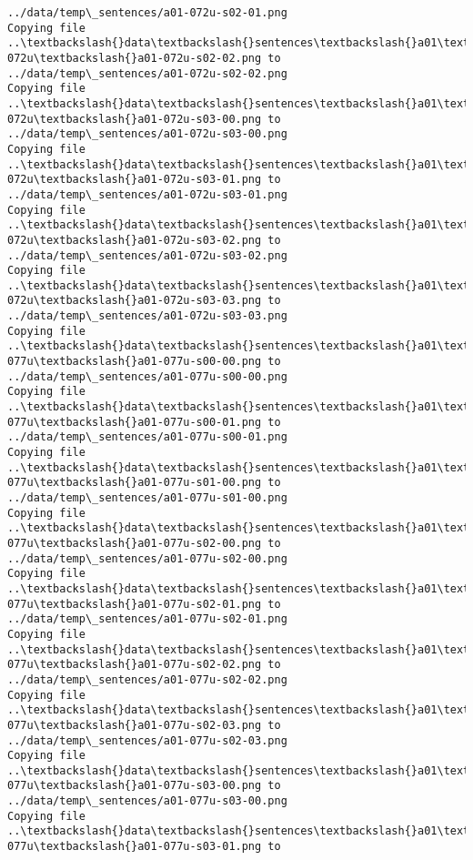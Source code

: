 \documentclass[11pt]{article}
\begin{document}
\begin{Verbatim}[commandchars=\\\{\}]
../data/temp\_sentences/a01-072u-s02-01.png
Copying file ..\textbackslash{}data\textbackslash{}sentences\textbackslash{}a01\textbackslash{}a01-072u\textbackslash{}a01-072u-s02-02.png to
../data/temp\_sentences/a01-072u-s02-02.png
Copying file ..\textbackslash{}data\textbackslash{}sentences\textbackslash{}a01\textbackslash{}a01-072u\textbackslash{}a01-072u-s03-00.png to
../data/temp\_sentences/a01-072u-s03-00.png
Copying file ..\textbackslash{}data\textbackslash{}sentences\textbackslash{}a01\textbackslash{}a01-072u\textbackslash{}a01-072u-s03-01.png to
../data/temp\_sentences/a01-072u-s03-01.png
Copying file ..\textbackslash{}data\textbackslash{}sentences\textbackslash{}a01\textbackslash{}a01-072u\textbackslash{}a01-072u-s03-02.png to
../data/temp\_sentences/a01-072u-s03-02.png
Copying file ..\textbackslash{}data\textbackslash{}sentences\textbackslash{}a01\textbackslash{}a01-072u\textbackslash{}a01-072u-s03-03.png to
../data/temp\_sentences/a01-072u-s03-03.png
Copying file ..\textbackslash{}data\textbackslash{}sentences\textbackslash{}a01\textbackslash{}a01-077u\textbackslash{}a01-077u-s00-00.png to
../data/temp\_sentences/a01-077u-s00-00.png
Copying file ..\textbackslash{}data\textbackslash{}sentences\textbackslash{}a01\textbackslash{}a01-077u\textbackslash{}a01-077u-s00-01.png to
../data/temp\_sentences/a01-077u-s00-01.png
Copying file ..\textbackslash{}data\textbackslash{}sentences\textbackslash{}a01\textbackslash{}a01-077u\textbackslash{}a01-077u-s01-00.png to
../data/temp\_sentences/a01-077u-s01-00.png
Copying file ..\textbackslash{}data\textbackslash{}sentences\textbackslash{}a01\textbackslash{}a01-077u\textbackslash{}a01-077u-s02-00.png to
../data/temp\_sentences/a01-077u-s02-00.png
Copying file ..\textbackslash{}data\textbackslash{}sentences\textbackslash{}a01\textbackslash{}a01-077u\textbackslash{}a01-077u-s02-01.png to
../data/temp\_sentences/a01-077u-s02-01.png
Copying file ..\textbackslash{}data\textbackslash{}sentences\textbackslash{}a01\textbackslash{}a01-077u\textbackslash{}a01-077u-s02-02.png to
../data/temp\_sentences/a01-077u-s02-02.png
Copying file ..\textbackslash{}data\textbackslash{}sentences\textbackslash{}a01\textbackslash{}a01-077u\textbackslash{}a01-077u-s02-03.png to
../data/temp\_sentences/a01-077u-s02-03.png
Copying file ..\textbackslash{}data\textbackslash{}sentences\textbackslash{}a01\textbackslash{}a01-077u\textbackslash{}a01-077u-s03-00.png to
../data/temp\_sentences/a01-077u-s03-00.png
Copying file ..\textbackslash{}data\textbackslash{}sentences\textbackslash{}a01\textbackslash{}a01-077u\textbackslash{}a01-077u-s03-01.png to

\end{Verbatim}
\end{document}
